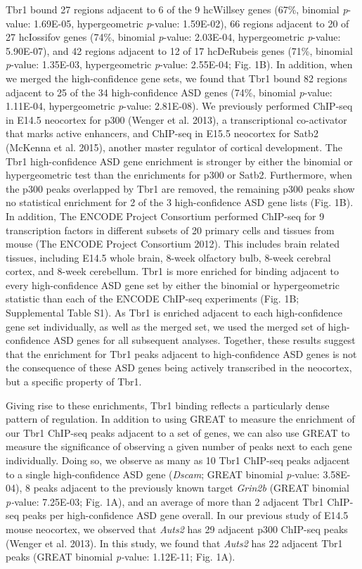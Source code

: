 \documentclass[]{article}
\begin{document}
Tbr1 bound 27 regions adjacent to 6 of the 9 hcWillsey genes (67\%,
binomial \emph{p}-value: 1.69E-05, hypergeometric \emph{p}-value:
1.59E-02), 66 regions adjacent to 20 of 27 hcIossifov genes (74\%,
binomial \emph{p}-value: 2.03E-04, hypergeometric \emph{p}-value:
5.90E-07), and 42 regions adjacent to 12 of 17 hcDeRubeis genes (71\%,
binomial \emph{p}-value: 1.35E-03, hypergeometric \emph{p}-value:
2.55E-04; Fig. 1B). In addition, when we merged the high-confidence gene
sets, we found that Tbr1 bound 82 regions adjacent to 25 of the 34
high-confidence ASD genes (74\%, binomial \emph{p}-value: 1.11E-04,
hypergeometric \emph{p}-value: 2.81E-08). We previously performed
ChIP-seq in E14.5 neocortex for p300 (Wenger et al. 2013), a
transcriptional co-activator that marks active enhancers, and ChIP-seq
in E15.5 neocortex for Satb2 (McKenna et al. 2015), another master
regulator of cortical development. The Tbr1 high-confidence ASD gene
enrichment is stronger by either the binomial or hypergeometric test
than the enrichments for p300 or Satb2. Furthermore, when the p300 peaks
overlapped by Tbr1 are removed, the remaining p300 peaks show no
statistical enrichment for 2 of the 3 high-confidence ASD gene lists
(Fig. 1B). In addition, The ENCODE Project Consortium performed ChIP-seq
for 9 transcription factors in different subsets of 20 primary cells and
tissues from mouse (The ENCODE Project Consortium 2012). This includes
brain related tissues, including E14.5 whole brain, 8-week olfactory
bulb, 8-week cerebral cortex, and 8-week cerebellum. Tbr1 is more
enriched for binding adjacent to every high-confidence ASD gene set by
either the binomial or hypergeometric statistic than each of the ENCODE
ChIP-seq experiments (Fig. 1B; Supplemental Table S1). As Tbr1 is
enriched adjacent to each high-confidence gene set individually, as well
as the merged set, we used the merged set of high-confidence ASD genes
for all subsequent analyses. Together, these results suggest that the
enrichment for Tbr1 peaks adjacent to high-confidence ASD genes is not
the consequence of these ASD genes being actively transcribed in the
neocortex, but a specific property of Tbr1.

Giving rise to these enrichments, Tbr1 binding reflects a particularly
dense pattern of regulation. In addition to using GREAT to measure the
enrichment of our Tbr1 ChIP-seq peaks adjacent to a set of genes, we can
also use GREAT to measure the significance of observing a given number
of peaks next to each gene individually. Doing so, we observe as many as
10 Tbr1 ChIP-seq peaks adjacent to a single high-confidence ASD gene
(\emph{Dscam}; GREAT binomial \emph{p­-}value: 3.58E-04), 8 peaks
adjacent to the previously known target \emph{Grin2b} (GREAT binomial
\emph{p-}value: 7.25E-03; Fig. 1A), and an average of more than 2
adjacent Tbr1 ChIP-seq peaks per high-confidence ASD gene overall. In
our previous study of E14.5 mouse neocortex, we observed that
\emph{Auts2} has 29 adjacent p300 ChIP-seq peaks (Wenger et al. 2013).
In this study, we found that \emph{Auts2} has 22 adjacent Tbr1 peaks
(GREAT binomial \emph{p-}value: 1.12E-11; Fig. 1A).
\end{document}
